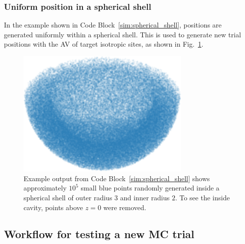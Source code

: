 \documentclass[
  9pt,
  bestpractices,
]{livecoms}
\begin{document}
\subsubsection{\label{sec:spherical_shell}Uniform position in a spherical shell}

In the example shown in Code Block~\ref{sim:spherical_shell}, positions are generated uniformly within a spherical shell.
This is used to generate new trial positions with the AV of target isotropic sites, as shown in Fig.~\ref{fig:spherical_shell}.

\begin{figure}

\end{figure}

\begin{figure}
\begin{centering}
\includegraphics[width=8.5cm]{../figures/spherical_shell.png}
\caption{
Example output from Code Block~\ref{sim:spherical_shell} shows approximately $10^5$ small blue points randomly generated inside a spherical shell of outer radius $3$ and inner radius $2$.
To see the inside cavity, points above $z=0$ were removed.
\label{fig:spherical_shell}
}
\end{centering}
\end{figure}

\subsection{\label{sec:testingnewtrial}Workflow for testing a new MC trial}
\end{document}
